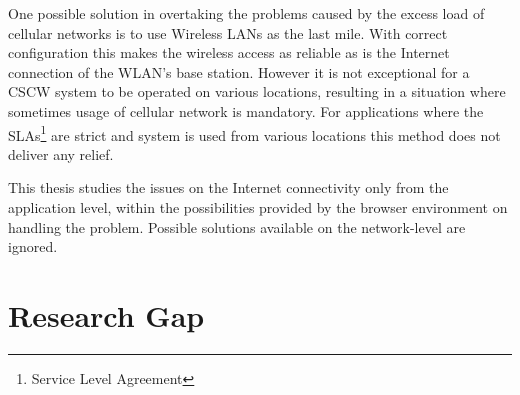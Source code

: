 One possible solution in overtaking the problems caused by the excess load of cellular networks is to use Wireless LANs as the last mile. With correct configuration this makes the wireless access as reliable as is the Internet connection of the WLAN's base station. However it is not exceptional for a CSCW system to be operated on various locations, resulting in a situation where sometimes usage of cellular network is mandatory. For applications where the SLAs\footnote{Service Level Agreement} are strict and system is used from various locations this method does not deliver any relief.

This thesis studies the issues on the Internet connectivity only from the application level, within the possibilities provided by the browser environment on handling the problem. Possible solutions available on the network-level are ignored.





\section{Research Gap}





